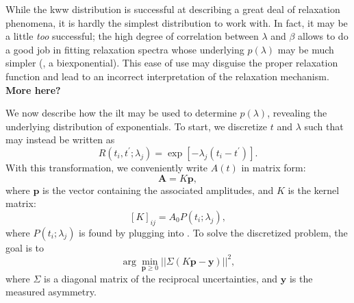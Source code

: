 While the \gls{kww} distribution is successful at describing a great deal of relaxation phenomena, it is hardly the simplest distribution to work with.
In fact, it may be a little \emph{too} successful;
the high degree of correlation between $\lambda$ and $\beta$ allows  to do a good job in fitting relaxation spectra whose underlying $p ( \lambda )$ may be much simpler (, a biexponential).
This ease of use may disguise the proper relaxation function and lead to an incorrect interpretation of the relaxation mechanism.
\textbf{More here?}

We now describe how the \gls{ilt} may be used to determine $p ( \lambda )$, revealing the underlying distribution of exponentials.
To start, we discretize $t$ and $\lambda$ such that  may instead be written as
%
\begin{equation} \label{eq:slr-discrete}
   R \left (t_{i}, t^{\prime};\lambda_j \right ) = \exp \left [- \lambda_{j} \left ( t_{i} - t^{\prime} \right ) \right ] .
\end{equation}
%
With this transformation, we conveniently write $A(t)$ in matrix form:
%
\begin{equation} \label{eq:signal-matrix}
   \mathbf{A} = K \mathbf{p},
\end{equation}
%
where $\mathbf{p}$ is the vector containing the associated amplitudes, and $K$ is the kernel matrix:
%
\begin{equation}
   \label{eq:kernel}
   [K]_{ij} = A_{0} P(t_i;\lambda_j),
\end{equation}
%
where $P(t_i;\lambda_j)$ is found by plugging  into .
%
To solve the discretized problem, the goal is to
%
\begin{equation}
   \label{eq:onnls}
   \arg \min_{\mathbf{p} \geq 0} || \Sigma \left ( K \mathbf{p} - \mathbf{y} \right ) ||^{2} ,
\end{equation}
%
where $\Sigma$ is a diagonal matrix of the reciprocal uncertainties, and $\mathbf{y}$ is the measured asymmetry. 

